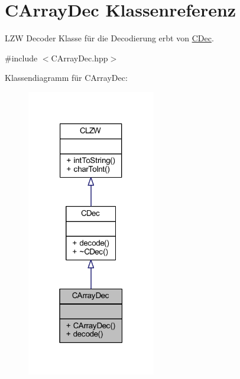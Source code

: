\hypertarget{class_c_array_dec}{}\section{C\+Array\+Dec Klassenreferenz}
\label{class_c_array_dec}


L\+ZW Decoder Klasse für die Decodierung erbt von \hyperlink{class_c_dec}{C\+Dec}.  




{\ttfamily \#include $<$C\+Array\+Dec.\+hpp$>$}



Klassendiagramm für C\+Array\+Dec\+:
\nopagebreak
\begin{figure}[H]
\begin{center}
\leavevmode
\includegraphics[width=159pt]{class_c_array_dec__inherit__graph}
\end{center}
\end{figure}


